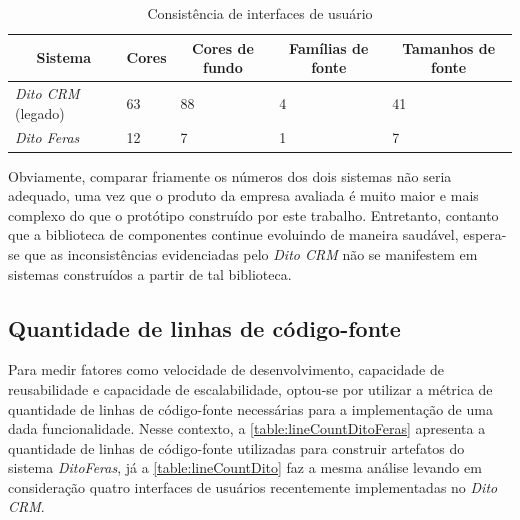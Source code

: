 \begin{table}
  \centering
  \begin{tabular}{|m{3cm}|m{1cm}|m{1cm}|m{1cm}|m{1cm}|} \hline
    
    \multicolumn{1}{|c|}{\bfseries Sistema} & \multicolumn{1}{c|}{\bfseries Cores} & \multicolumn{1}{c|}{\bfseries Cores de fundo} & \multicolumn{1}{c|}{\bfseries Famílias de fonte} & \multicolumn{1}{c|}{\bfseries Tamanhos de fonte} \\\hline
    
    \textit{Dito CRM} (legado) & 63 & 88 & 4 & 41 \\\hline
    \textit{Dito Feras} & 12 & 7 & 1 & 7 \\\hline
      
  \end{tabular}
  \caption{Consistência de interfaces de usuário}
  \label{table:interfaceConsistence}
\end{table}

Obviamente, comparar friamente os números dos dois sistemas não seria adequado, uma vez que o produto da empresa avaliada é muito maior e mais complexo do que o protótipo construído por este trabalho. Entretanto, contanto que a biblioteca de componentes continue evoluindo de maneira saudável, espera-se que as inconsistências evidenciadas pelo \textit{Dito CRM} não se manifestem em sistemas construídos a partir de tal biblioteca.

\subsection{Quantidade de linhas de código-fonte}

Para medir fatores como velocidade de desenvolvimento, capacidade de reusabilidade e capacidade de escalabilidade, optou-se por utilizar a métrica de quantidade de linhas de código-fonte necessárias para a implementação de uma dada funcionalidade. Nesse contexto, a \autoref{table:lineCountDitoFeras} apresenta a quantidade de linhas de código-fonte utilizadas para construir artefatos do sistema \textit{DitoFeras}, já a \autoref{table:lineCountDito} faz a mesma análise levando em consideração quatro interfaces de usuários recentemente implementadas no \textit{Dito CRM}.

